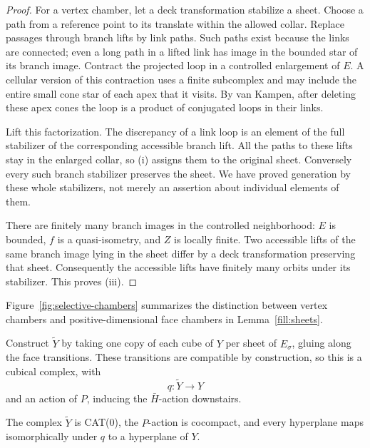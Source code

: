 \begin{proof}
For a vertex chamber, let a deck transformation stabilize a sheet.
Choose a path from a reference point to its translate within the
allowed collar.  Replace passages through branch lifts by link paths.
Such paths exist because the links are connected; even a long path
in a lifted link has image in the bounded star of its branch image.
Contract the projected loop in a controlled enlargement of \(E\).
A cellular version of this contraction uses a finite subcomplex and
may include the entire small cone star of each apex that it visits.
By van Kampen, after deleting these apex cones the loop is a product
of conjugated loops in their links.

Lift this factorization.  The discrepancy of a link loop is an element
of the full stabilizer of the corresponding accessible branch lift.
All the paths to these lifts stay in the enlarged collar, so (i) assigns
them to the original sheet.  Conversely every such branch stabilizer
preserves the sheet.  We have proved generation by these whole
stabilizers, not merely an assertion about individual elements of them.

There are finitely many branch images in the controlled neighborhood:
\(E\) is bounded, \(f\) is a quasi-isometry, and \(Z\) is locally finite.
Two accessible lifts of the same branch image lying in the sheet differ
by a deck transformation preserving that sheet.  Consequently the
accessible lifts have finitely many orbits under its stabilizer.
This proves (iii).
\end{proof}

Figure~\ref{fig:selective-chambers} summarizes the distinction between
vertex chambers and positive-dimensional face chambers in
Lemma~\ref{fill:sheets}.


Construct \(\widetilde Y\) by taking one copy of each cube of \(Y\) per
sheet of \(E_\sigma\), gluing along the face transitions.  These transitions
are compatible by construction, so this is a cubical complex, with
\begin{equation}
 q:\widetilde Y\longrightarrow Y
 \label{fill:cubical-cover}
\end{equation}
and an action of \(P\), inducing the \(\bar H\)-action downstairs.

\begin{lemma}\label{fill:cubical}
The complex \(\widetilde Y\) is CAT(0), the \(P\)-action is cocompact,
and every hyperplane maps isomorphically under \(q\) to a hyperplane of
\(Y\).
\end{lemma}

